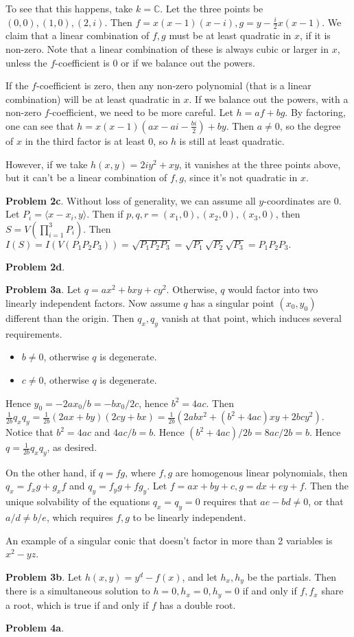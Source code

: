 \documentclass[11pt]{amsart}
\theoremstyle{named}
\newcommand{\cmplx}{\mathbb{C}}
\begin{document}
To see that this happens, take $k = \cmplx$. Let the three points be $(0, 0), (1, 0), (2, i)$. Then $f = x (x - 1)(x - i), g = y - \frac{i}{2} x(x - 1)$. We claim that a linear combination of $f, g$ must be at least quadratic in $x$, if it is non-zero. Note that a linear combination of these is always cubic or larger in $x$, unless the $f$-coefficient is $0$ or if we balance out the powers.

If the $f$-coefficient is zero, then any non-zero polynomial (that is a linear combination) will be at least quadratic in $x$. If we balance out the powers, with a non-zero $f$-coefficient, we need to be more careful. Let $h = af + bg$. By factoring, one can see that $h = x(x - 1)(ax - ai - \frac{bi}{2}) + by.$ Then $a \neq 0$, so the degree of $x$ in the third factor is at least 0, so $h$ is still at least quadratic. 

However, if we take $h(x,y) = 2iy^2 + xy$, it vanishes at the three points above, but it can't be a linear combination of $f, g$, since it's not quadratic in $x$.

\noindent\textbf{Problem 2c}. Without loss of generality, we can assume all $y$-coordinates are 0. Let $P_i = \langle x - x_i, y \rangle.$ Then if $p, q, r = (x_1, 0), (x_2, 0), (x_3, 0)$, then $S = V(\prod_{i = 1}^3 P_i).$ Then $I(S) = I(V(P_1 P_2 P_3)) = \sqrt{P_1 P_2 P_3} = \sqrt {P_1} \sqrt {P_2} \sqrt {P_3} = P_1 P_2 P_3.$

\noindent\textbf{Problem 2d}.

\newpage
\noindent\textbf{Problem 3a}. Let $q = ax^2 + bxy + cy^2$. Otherwise, $q$ would factor into two linearly independent factors. Now assume $q$ has a singular point $(x_0, y_0)$ different than the origin. Then $q_x, q_y$ vanish at that point, which induces several requirements.
\begin{itemize}
\item $b \neq 0$, otherwise $q$ is degenerate.
\item $c \neq 0$, otherwise $q$ is degenerate.
\end{itemize}
Hence $y_0 = -2ax_0/b = -bx_0/2c$, hence $b^2 = 4ac$. Then $\frac{1}{2b} q_x q_y = \frac{1}{2b} (2ax + by) (2cy + bx) = \frac{1}{2b} (2abx^2 + (b^2 + 4ac)xy + 2bcy^2).$ Notice that $b^2 = 4ac$ and $4ac/b = b$. Hence $(b^2 + 4ac)/2b = 8ac/2b = b$. Hence $q = \frac{1}{2b} q_x q_y$, as desired.

On the other hand, if $q = fg$, where $f, g$ are homogenous linear polynomials, then $q_x = f_x g + g_x f$ and $q_y = f_y g + f g_y$. Let $f = ax + by + c, g = dx + ey + f$. Then the unique solvability of the equations $q_x = q_y = 0$ requires that $ae - bd \neq 0$, or that $a/d \neq b/e$, which requires $f, g$ to be linearly independent.

An example of a singular conic that doesn't factor in more than 2 variables is $x^2 - yz$.

\noindent\textbf{Problem 3b}. Let $h(x,y) = y^d - f(x)$, and let $h_x, h_y$ be the partials. Then there is a simultaneous solution to $h = 0, h_x = 0, h_y = 0$ if and only if $f, f_x$ share a root, which is true if and only if $f$ has a double root.

\noindent\textbf{Problem 4a}.
\end{document}
